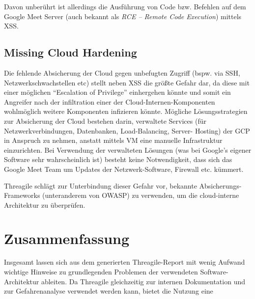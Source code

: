 \documentclass{article}
\begin{document}
Davon unberührt ist allerdings die Ausführung von Code bzw. Befehlen auf dem Google 
Meet Server (auch bekannt als \textit{RCE – Remote Code Execution}) mittels XSS.

\subsection{Missing Cloud Hardening}

Die fehlende Absicherung der Cloud gegen unbefugten Zugriff (bspw. via SSH, 
Netzwerkschwachstellen etc) stellt neben XSS die größte Gefahr dar, da diese mit einer 
möglichen ``Escalation of Privilege'' einhergehen könnte und somit ein Angreifer nach der 
infiltration einer der Cloud-Internen-Komponenten wohlmöglich weitere Komponenten 
infizieren könnte. Mögliche Lösungsstrategien zur Absicherung der Cloud bestehen darin,
verwaltete Services (für Netzwerkverbindungen, Datenbanken, Load-Balancing, Server-
Hosting) der GCP in Anspruch zu nehmen, anstatt mittels VM eine manuelle Infrastruktur 
einzurichten. Bei Verwendung der verwalteten Lösungen (was bei Google's eigener Software 
sehr wahrscheinlich ist) besteht keine Notwendigkeit, dass sich das Google Meet Team um 
Updates der Netzwerk-Software, Firewall etc. kümmert. 

Threagile schlägt zur Unterbindung dieser Gefahr vor, bekannte Absicherungs-Frameworks 
(unteranderem von OWASP) zu verwenden, um die cloud-interne Architektur zu überprüfen.

\section{Zusammenfassung}

Insgesamt lassen sich aus dem generierten Threagile-Report mit wenig Aufwand wichtige 
Hinweise zu grundlegenden Problemen der verwendeten Software-Architektur ableiten. Da 
Threagile gleichzeitig zur internen Dokumentation und zur Gefahrenanalyse verwendet werden 
kann, bietet die Nutzung eine 
\end{document}
